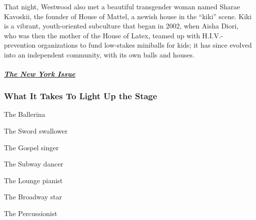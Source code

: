That night, Westwood also met a beautiful transgender woman named Sharae
Kavoskii, the founder of House of Mattel, a newish house in the ``kiki''
scene. Kiki is a vibrant, youth-oriented subculture that began in 2002,
when Aisha Diori, who was then the mother of the House of Latex, teamed
up with H.I.V.-prevention organizations to fund low-stakes miniballs for
kids; it has since evolved into an independent community, with its own
balls and houses.

\hypertarget{the-new-york-issue}{%
\subparagraph{\texorpdfstring{\href{https://www.nytimes3xbfgragh.onion/interactive/2019/05/30/magazine/performers-new-york.html}{The
New York Issue}}{The New York Issue}}\label{the-new-york-issue}}

\hypertarget{what-it-takes-to-light-up-the-stage}{%
\subsubsection{What It Takes To Light Up the
Stage}\label{what-it-takes-to-light-up-the-stage}}

\href{https://www.nytimes3xbfgragh.onion/interactive/2019/05/30/magazine/dance-ballet-new-york.html}{}

The Ballerina

\href{https://www.nytimes3xbfgragh.onion/interactive/2019/05/30/magazine/sword-swallowing-new-york.html}{}

The Sword swallower

\href{https://www.nytimes3xbfgragh.onion/interactive/2019/05/30/magazine/gospel-singer-new-york.html}{}

The Gospel singer

\href{https://www.nytimes3xbfgragh.onion/interactive/2019/05/30/magazine/subway-dance-new-york.html}{}

The Subway dancer

\href{https://www.nytimes3xbfgragh.onion/interactive/2019/05/30/magazine/earl-rose-piano-carlyle-new-york.html}{}

The Lounge pianist

\href{https://www.nytimes3xbfgragh.onion/interactive/2019/05/30/magazine/broadway-kiss-me-kate.html}{}

The Broadway star

\href{https://www.nytimes3xbfgragh.onion/interactive/2019/05/30/magazine/latin-beat-new-york.html}{}

The Percussionist

\href{https://www.nytimes3xbfgragh.onion/interactive/2019/05/30/magazine/female-comedy-new-york.html}{}

